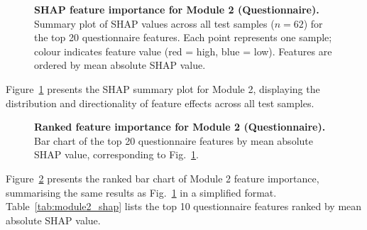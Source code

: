 \documentclass[10pt,letterpaper]{article}
\begin{document}
\begin{figure}[!h]
\caption{\textbf{SHAP feature importance for Module 2 (Questionnaire).} Summary plot of SHAP values across all test samples ($n=62$) for the top 20 questionnaire features. Each point represents one sample; colour indicates feature value (red = high, blue = low). Features are ordered by mean absolute SHAP value.}
\label{fig:module2_shap_summary}
\end{figure}

Figure~\ref{fig:module2_shap_summary} presents the SHAP summary plot for Module 2, displaying the distribution and directionality of feature effects across all test samples.

\begin{figure}[!h]
\caption{\textbf{Ranked feature importance for Module 2 (Questionnaire).} Bar chart of the top 20 questionnaire features by mean absolute SHAP value, corresponding to Fig.~\ref{fig:module2_shap_summary}.}
\label{fig:module2_bar}
\end{figure}

Figure~\ref{fig:module2_bar} presents the ranked bar chart of Module 2 feature importance, summarising the same results as Fig.~\ref{fig:module2_shap_summary} in a simplified format. Table~\ref{tab:module2_shap} lists the top 10 questionnaire features ranked by mean absolute SHAP value.
\end{document}
